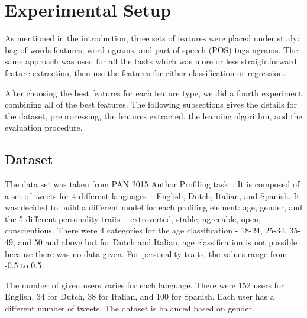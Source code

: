 \documentclass[a4paper]{llncs}
\begin{document}
\section{Experimental Setup}
As mentioned in the introduction, three sets of features  were placed under study: bag-of-words features, word ngrams, and  part of speech (POS) tags ngrams. The same approach was used for all the tasks which was more or less straightforward: feature extraction, then use the features for either classification or regression. 



After choosing the best features for each feature type, we did a fourth experiment combining all of the best features. %
The following subsections gives the details for the dataset, preprocessing, the features extracted, the learning algorithm, and the evaluation procedure. 

\subsection{Dataset}
The data set was taken from PAN 2015 Author Profiling task~\cite{rangel2015overview}. It is composed of a set of tweets for 4 different languages -- English, Dutch, Italian, and Spanish. It was decided to build a different model for each profiling element: age, gender, and the 5 different personality traits -- extroverted, stable, agreeable, open, conscientious. There were 4 categories for the age classification - 18-24, 25-34, 35-49, and 50 and above but for Dutch and Italian, age classification is not possible because there was no data given. For personality traits, the values range from -0.5 to 0.5.

The number of given users varies for each language. There were 152 users for English, 34 for Dutch, 38 for Italian, and 100 for Spanish. Each user has a different number of tweets. The dataset is balanced based on gender. 
\end{document}
